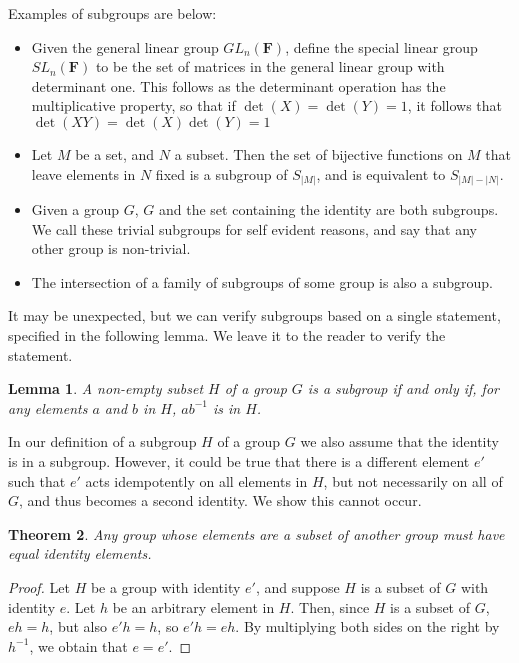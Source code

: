 \documentclass[12pt]{report}
\newtheorem{theorem}{Theorem}[section]
\newtheorem{lemma}[theorem]{Lemma}
\begin{document}
Examples of subgroups are below:
\begin{itemize}
    \item Given the general linear group $GL_n(\mathbf{F})$, define the special linear group $SL_n(\mathbf{F})$ to be the set of matrices in the general linear group with determinant one. This follows as the determinant operation has the multiplicative property, so that if $\det(X) = \det(Y) = 1$, it follows that $\det(XY) = \det(X)\det(Y) = 1$
    \item Let $M$ be a set, and $N$ a subset. Then the set of bijective functions on $M$ that leave elements in $N$ fixed is a subgroup of $S_{|M|}$, and is equivalent to $S_{|M| - |N|}$.
    \item Given a group $G$, $G$ and the set containing the identity are both subgroups. We call these trivial subgroups for self evident reasons, and say that any other group is non-trivial.
    \item The intersection of a family of subgroups of some group is also a subgroup.
\end{itemize}

It may be unexpected, but we can verify subgroups based on a single statement, specified in the following lemma. We leave it to the reader to verify the statement.

\begin{lemma}
    A non-empty subset $H$ of a group $G$ is a subgroup if and only if, for any elements $a$ and $b$ in $H$, $ab^{-1}$ is in $H$.
\end{lemma}

In our definition of a subgroup $H$ of a group $G$ we also assume that the identity is in a subgroup. However, it could be true that there is a different element $e'$ such that $e'$ acts idempotently on all elements in $H$, but not necessarily on all of $G$, and thus becomes a second identity. We show this cannot occur.

\begin{theorem}
    Any group whose elements are a subset of another group must have equal identity elements.
\end{theorem}
\begin{proof}
    Let $H$ be a group with identity $e'$, and suppose $H$ is a subset of $G$ with identity $e$. Let $h$ be an arbitrary element in $H$. Then, since $H$ is a subset of $G$, $eh = h$, but also $e'h = h$, so $e'h = eh$. By multiplying both sides on the right by $h^{-1}$, we obtain that $e = e'$.
\end{proof}
\end{document}
